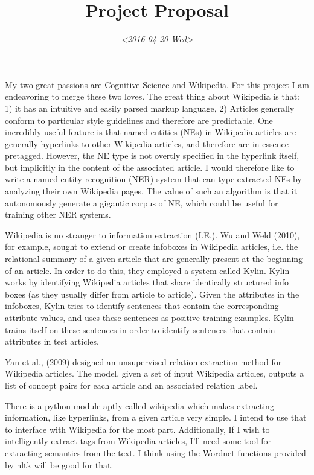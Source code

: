 \documentclass[11pt]{article}
\date{\textit{<2016-04-20 Wed>}}
\title{Project Proposal}
\begin{document}
\maketitle
My two great passions are Cognitive Science and Wikipedia. For this project I am endeavoring to merge these two loves. The great thing about Wikipedia is that: 1) it has an intuitive and easily parsed markup language, 2) Articles generally conform to particular style guidelines and therefore are predictable. One incredibly useful feature is that named entities (NEs) in Wikipedia articles are generally hyperlinks to other Wikipedia articles, and therefore are in essence pretagged. However, the NE type is not overtly specified in the hyperlink itself, but implicitly in the content of the associated article. I would therefore like to write a named entity recognition (NER) system that can type extracted NEs by analyzing their own Wikipedia pages. The value of such an algorithm is that it autonomously generate a gigantic corpus of NE, which could be useful for training other NER systems. 

Wikipedia is no stranger to information extraction (I.E.). Wu and Weld (2010), for example, sought to extend or create infoboxes in Wikipedia articles, i.e. the relational summary of a given article that are generally present at the beginning of an article. In order to do this, they employed a system called Kylin. Kylin works by identifying Wikipedia articles that share identically structured info boxes (as they usually differ from article to article). Given the attributes in the infoboxes, Kylin tries to identify sentences that contain the corresponding attribute values, and uses these sentences as positive training examples. Kylin trains itself on these sentences in order to identify sentences that contain attributes in test articles.

Yan et al., (2009) designed an unsupervised relation extraction method for Wikipedia articles. The model, given a set of input Wikipedia articles, outputs a list of concept pairs for each article and an associated relation label. 

There is a python module aptly called wikipedia which makes extracting information, like hyperlinks, from a given article very simple. I intend to use that to interface with Wikipedia for the most part. Additionally, If I wish to intelligently extract tags from Wikipedia articles, I'll need some tool for extracting semantics from the text. I think using the Wordnet functions provided by nltk will be good for that.
\end{document}
